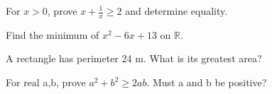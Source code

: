 \documentclass[11pt]{article}
\begin{document}
For \(x>0\), prove \(x+\frac{1}{x}\geq 2\) and determine equality.\par
\vspace{5pt}
Find the minimum of \(x^{2}-6x+13\) on \(\mathbb{R}\).\par
\vspace{5pt}
A rectangle has perimeter 24 m. What is its greatest area?\par
\vspace{5pt}
For real a,b, prove \(a^{2}+b^{2}\geq 2ab\). Must a and b be positive?\par
\vspace{5pt}
\end{document}
